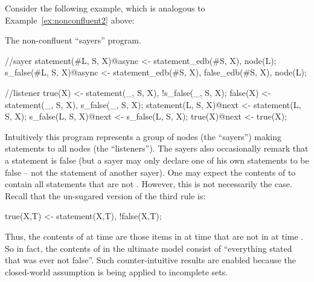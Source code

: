 Consider the following example, which is analogous to Example~\ref{ex:nonconfluent2} above:

\begin{example}
\label{ex:sayers}
The non-confluent ``sayers'' program.

\begin{Dedalus}
//sayer
statement(#L, S, X)@async <- statement_edb(#S, X),
                             node(L);
s_false(#L, S, X)@async <- statement_edb(#S, X),
                           false_edb(#S, X),
                           node(L);

//listener
true(X) <- statement(_, S, X), !s_false(_, S, X);
false(X) <- statement(_, S, X), s_false(_, S, X);
statement(L, S, X)@next <- statement(L, S, X);
s_false(L, S, X)@next <- s_false(L, S, X);
true(X)@next <- true(X);
\end{Dedalus}
\end{example}

Intuitively this program represents a group of nodes (the ``sayers'') making statements to all nodes (the ``listeners'').  The sayers also occasionally remark that a statement is false (but a sayer may only declare one of his own statements to be false -- not the statement of another sayer).  One may expect the contents of  to contain all statements that are not .  However, this is not necessarily the case.  Recall that the un-sugared version of the third rule is:

\begin{Dedalus}
true(X,T) <- statement(X,T), !false(X,T);
\end{Dedalus}

\noindent
Thus, the contents of  at time  are those items in  at time  that are not in  at time .  So in fact, the contents of  in the ultimate model consist of ``everything stated that was ever not false''.  Such counter-intuitive results are enabled because the closed-world assumption is being applied to incomplete sets.

